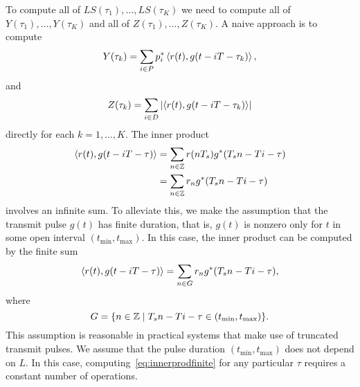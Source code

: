 \documentclass[journal]{IEEEtranTCOM}
\begin{document}
To compute all of $LS(\tau_1), \dots, LS(\tau_K)$ we need to compute all of $Y(\tau_1), \dots, Y(\tau_K)$ and all of $Z(\tau_1), \dots, Z(\tau_K)$.  A naive approach is to compute 
\[
Y(\tau_k) = \sum_{i \in P} p_i^* \left\langle r(t) , g(t - iT - \tau_k) \right\rangle,
\]
and 
\[
Z(\tau_k) = \sum_{i \in D} {\left\vert  \left\langle r(t) , g(t - iT - \tau_k) \right\rangle  \right\vert}
\] 
directly for each $k=1, \dots, K$.  %
The inner product
\begin{align*}
\left\langle r(t) , g(t - iT - \tau) \right\rangle &= \sum_{n\in{\mathbb Z}}r(nT_s)g^*(T_sn - Ti - \tau) \\
&= \sum_{n\in{\mathbb Z}} r_n g^*(T_sn - Ti - \tau)
\end{align*}
involves an infinite sum.  To alleviate this, we make the assumption that the transmit pulse $g(t)$ has finite duration, that is, $g(t)$ is nonzero only for $t$ in some open interval $(t_{\text{min}},t_{\text{max}})$.  In this case, the inner product can be computed by the finite sum
\begin{equation}\label{eq:innerprodfinite}
\dotprod{r(t)}{g(t - iT - \tau)} =  \sum_{n \in G} r_n g^*(T_sn - Ti - \tau),
\end{equation}
where 
\[
G = \{ n \in {\mathbb Z} \mid T_s n - Ti - \tau \in (t_{\text{min}},t_{\text{max}}) \}.
\]
This assumption is reasonable in practical systems that make use of truncated transmit pulses. We assume that the pulse duration $(t_{\text{min}},t_{\text{max}})$ does not depend on $L$.  In this case, computing~\eqref{eq:innerprodfinite} for any particular $\tau$ requires a constant number of operations.
\end{document}
